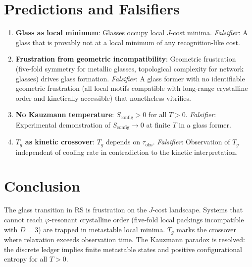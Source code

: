 \documentclass[12pt,a4paper]{article}
\theoremstyle{definition}
\theoremstyle{remark}
\begin{document}
\section{Predictions and Falsifiers}
\label{sec:falsifiers}

\begin{enumerate}[label=(\roman*)]
\item \textbf{Glass as local minimum}: Glasses occupy local $J$-cost
  minima.  \textit{Falsifier}: A glass that is provably not at a
  local minimum of any recognition-like cost.

\item \textbf{Frustration from geometric incompatibility}: Geometric
  frustration (five-fold symmetry for metallic glasses, topological
  complexity for network glasses) drives glass formation.
  \textit{Falsifier}: A glass former with no identifiable geometric
  frustration (all local motifs compatible with long-range crystalline
  order and kinetically accessible) that nonetheless vitrifies.

\item \textbf{No Kauzmann temperature}: $S_{\mathrm{config}} > 0$ for
  all $T > 0$.  \textit{Falsifier}: Experimental demonstration of
  $S_{\mathrm{config}} \to 0$ at finite $T$ in a glass former.

\item \textbf{$T_g$ as kinetic crossover}: $T_g$ depends on
  $\tau_{\mathrm{obs}}$.  \textit{Falsifier}: Observation of $T_g$
  independent of cooling rate in contradiction to the kinetic
  interpretation.
\end{enumerate}

\section{Conclusion}
\label{sec:conclusion}

The glass transition in RS is frustration on the $J$-cost landscape.
Systems that cannot reach $\varphi$-resonant crystalline order
(five-fold local packings incompatible with $D = 3$) are trapped in
metastable local minima.  $T_g$ marks the crossover where relaxation
exceeds observation time.  The Kauzmann paradox is resolved: the
discrete ledger implies finite metastable states and positive
configurational entropy for all $T > 0$.
\end{document}
